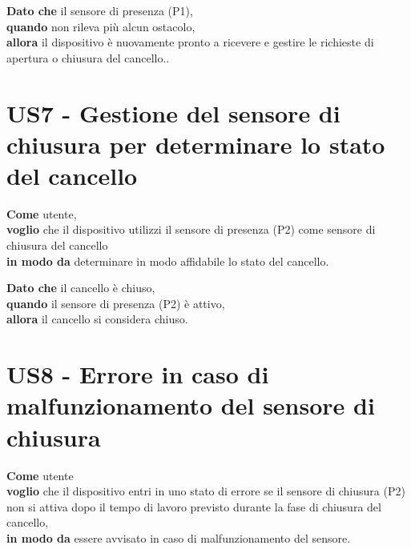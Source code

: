 \begin{tcolorbox}[title={Criterio di Accettazione \#2}, colback=blue!20!white, colframe=blue!80!black]
    \textbf{Dato che} il sensore di presenza (P1), \\
    \textbf{quando} non rileva più alcun ostacolo, \\
    \textbf{allora} il dispositivo è nuovamente pronto a ricevere e gestire le richieste di apertura o chiusura del cancello..
\end{tcolorbox}

\section{US7 - Gestione del sensore di chiusura per determinare lo stato del cancello}
\begin{tcolorbox}[title={Descrizione}, colback=red!20!white, colframe=red!80!black]
    \textbf{Come} utente, \\
    \textbf{voglio} che il dispositivo utilizzi il sensore di presenza (P2) come sensore di chiusura del cancello\\
    \textbf{in modo da} determinare in modo affidabile lo stato del cancello.
\end{tcolorbox}

\begin{tcolorbox}[title={Criterio di Accettazione}, colback=blue!20!white, colframe=blue!80!black]
    \textbf{Dato che} il cancello è chiuso, \\
    \textbf{quando} il sensore di presenza (P2) è attivo, \\
    \textbf{allora} il cancello si considera chiuso.
\end{tcolorbox}

\section{US8 - Errore in caso di malfunzionamento del sensore di chiusura}
\begin{tcolorbox}[title={Descrizione}, colback=red!20!white, colframe=red!80!black]
    \textbf{Come} utente\\
    \textbf{voglio} che il dispositivo entri in uno stato di errore se il sensore di chiusura (P2) non si attiva dopo il tempo di lavoro previsto durante la fase di chiusura del cancello,\\
    \textbf{in modo da} essere avvisato in caso di malfunzionamento del sensore.
\end{tcolorbox}

